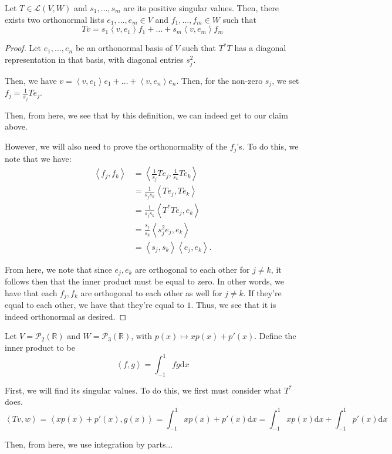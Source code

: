 \documentclass[openany]{book}
\newcommand{\RR}{\mathbb{R}}
\newcommand{\innerproduct}[2]{\left\langle{#1}, {#2}\right\rangle}
\begin{document}
\begin{thm}
	Let $T \in \mathcal L(V,W)$ and $s_{1}, \ldots, s_{m}$ are its positive singular values. Then, there exists two orthonormal lists $e_{1}, \ldots, e_{m} \in V$ and $f_{1}, \ldots, f_{m} \in W$ such that
	\begin{equation*}
		Tv = s_{1}\innerproduct{v}{e_{1}}f_{1} + \ldots + s_{m}\innerproduct{v}{e_{m}}f_{m}
	\end{equation*}
\end{thm}
\begin{proof}
	Let $e_{1}, \ldots, e_{n}$ be an orthonormal basis of $V$ such that $T^{*}T$ has a diagonal representation in that basis, with diagonal entries $s_{j}^{2}$.
	
	Then, we have $v = \innerproduct{v}{e_{1}}e_{1} + \ldots + \innerproduct{v}{e_{n}}e_{n}$. Then, for the non-zero $s_{j}$, we set $f_{j} = \frac{1}{s_{j}}Te_{j}$.
	
	Then, from here, we see that by this definition, we can indeed get to our claim above.
	
	However, we will also need to prove the orthonormality of the $f_{j}$'s. To do this, we note that we have:
	\begin{align*}
		\innerproduct{f_{j}}{f_{k}} &= \innerproduct{\frac{1}{s_{j}}Te_{j}}{\frac{1}{s_{k}}Te_{k}} \\
		&= \frac{1}{s_{j}s_{k}}\innerproduct{Te_{j}}{Te_{k}} \\
		&= \frac{1}{s_{j}s_{k}}\innerproduct{T^{*}Te_{j}}{e_{k}} \\
		&= \frac{s_{j}}{s_{k}}\innerproduct{s_{j}^{2}e_{j}}{e_{k}} \\
		&= \innerproduct{s_{j}}{s_{k}}\innerproduct{e_{j}}{e_{k}}.
	\end{align*}

	From here, we note that since $e_{j}, e_{k}$ are orthogonal to each other for $j \neq k$, it follows then that the inner product must be equal to zero. In other words, we have that each $f_{j}, f_{k}$ are orthogonal to each other as well for $j \neq k$. If they're equal to each other, we have that they're equal to $1$. Thus, we see that it is indeed orthonormal as desired.
\end{proof}
\begin{example}
	Let $V = \mathscr{P}_{2}(\RR)$ and $W = \mathscr{P}_{3}(\RR)$, with $p(x) \mapsto xp(x) + p'(x)$. Define the inner product to be
	\begin{equation*}
		\innerproduct{f}{g} = \int_{-1}^{1} fg \mathrm dx
	\end{equation*}

	First, we will find its singular values. To do this, we first must consider what $T^{*}$ does.
	\begin{equation*}
		\innerproduct{Tv}{w} = \innerproduct{xp(x) + p'(x)}{g(x)} = \int_{-1}^{1} xp(x) + p'(x) \mathrm dx = \int_{-1}^{1} xp(x) \mathrm dx + \int_{-1}^{1} p'(x) \mathrm dx
	\end{equation*}
	
	Then, from here, we use integration by parts...
\end{example}
\end{document}
